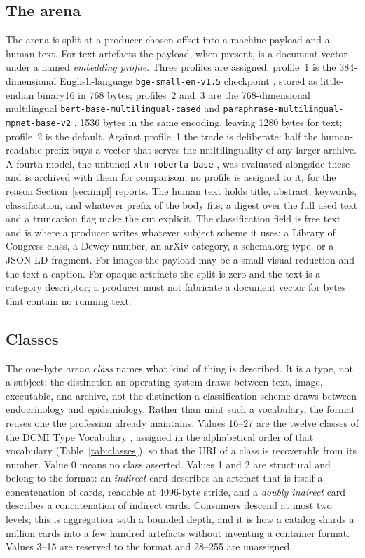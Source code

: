 \documentclass[sigconf]{acmart}
\begin{document}
\subsection{The arena}

The arena is split at a producer-chosen offset into a machine payload and a
human text. For text artefacts the payload, when present, is a document vector
under a named \emph{embedding profile}. Three profiles are assigned:
profile~1 is the 384-dimensional English-language \nolinkurl{bge-small-en-v1.5}
checkpoint \cite{BAAI:2023,Xiao:2023}, stored as little-endian binary16 in
768 bytes; profiles~2 and~3 are the 768-dimensional multilingual
\nolinkurl{bert-base-multilingual-cased} \cite{Google:2019,Devlin:2019} and
\nolinkurl{paraphrase-multilingual-mpnet-base-v2} \cite{Reimers:2021,Reimers:2020},
1536 bytes in the same encoding, leaving 1280 bytes for text; profile~2 is
the default. Against profile~1 the trade is deliberate: half the
human-readable prefix buys a vector that serves the multilinguality of any
larger archive. A fourth model, the untuned \texttt{xlm-roberta-base}
\cite{FacebookAI:2019,Conneau:2020b}, was evaluated alongside these and is
archived with them for comparison; no profile is assigned to it, for the
reason Section~\ref{sec:impl} reports. The human text holds title, abstract,
keywords, classification, and whatever prefix of the body fits; a digest over
the full used text and a truncation flag make the cut explicit. The
classification field is free text and is where a producer writes whatever
subject scheme it uses: a Library of Congress class, a Dewey number, an arXiv
category, a schema.org type, or a JSON-LD fragment. For images the payload may
be a small visual reduction and the text a caption. For opaque artefacts the
split is zero and the text is a category descriptor; a producer must not
fabricate a document vector for bytes that contain no running text.

\subsection{Classes}
\label{sec:classes}

The one-byte \emph{arena class} names what kind of thing is described. It is a
type, not a subject: the distinction an operating system draws between text,
image, executable, and archive, not the distinction a classification scheme
draws between endocrinology and epidemiology. Rather than mint such a
vocabulary, the format reuses one the profession already maintains.
Values 16--27 are the twelve classes of the DCMI Type Vocabulary
\cite{DCMI:2020}, assigned in the alphabetical order of that vocabulary
(Table~\ref{tab:classes}), so that the URI of a class is recoverable from its
number. Value 0 means no class asserted. Values 1 and 2 are structural and
belong to the format: an \emph{indirect} card describes an artefact that is
itself a concatenation of cards, readable at 4096-byte stride, and a
\emph{doubly indirect} card describes a concatenation of indirect cards.
Consumers descend at most two levels; this is aggregation with a bounded
depth, and it is how a catalog shards a million cards into a few hundred
artefacts without inventing a container format. Values 3--15 are reserved to
the format and 28--255 are unassigned.
\end{document}
